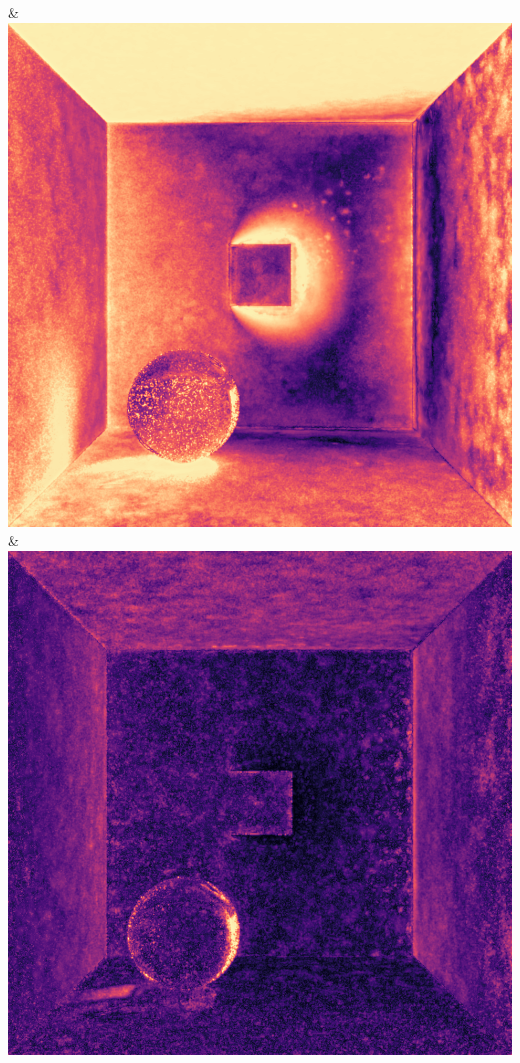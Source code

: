 & \includegraphics[width=\linewidth]{figures/py/tests/quality_comparison/nrc+lt+bal_1spp_ajar_caustic_flip.png}
& \includegraphics[width=\linewidth]{figures/py/tests/quality_comparison/nrc+sppc_1spp_ajar_caustic_flip.png}
